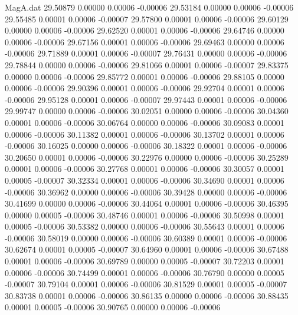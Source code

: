 \begin{filecontents}{MagA.dat}
  29.50879    0.00000    0.00006   -0.00006
  29.53184    0.00000    0.00006   -0.00006
  29.55485    0.00001    0.00006   -0.00007
  29.57800    0.00001    0.00006   -0.00006
  29.60129    0.00000    0.00006   -0.00006
  29.62520    0.00001    0.00006   -0.00006
  29.64746    0.00000    0.00006   -0.00006
  29.67156    0.00001    0.00006   -0.00006
  29.69463    0.00000    0.00006   -0.00006
  29.71889    0.00001    0.00006   -0.00007
  29.76431    0.00000    0.00006   -0.00006
  29.78844    0.00000    0.00006   -0.00006
  29.81066    0.00001    0.00006   -0.00007
  29.83375    0.00000    0.00006   -0.00006
  29.85772    0.00001    0.00006   -0.00006
  29.88105    0.00000    0.00006   -0.00006
  29.90396    0.00001    0.00006   -0.00006
  29.92704    0.00001    0.00006   -0.00006
  29.95128    0.00001    0.00006   -0.00007
  29.97443    0.00001    0.00006   -0.00006
  29.99747    0.00000    0.00006   -0.00006
  30.02051    0.00000    0.00006   -0.00006
  30.04360    0.00001    0.00006   -0.00006
  30.06764    0.00000    0.00006   -0.00006
  30.09083    0.00001    0.00006   -0.00006
  30.11382    0.00001    0.00006   -0.00006
  30.13702    0.00001    0.00006   -0.00006
  30.16025    0.00000    0.00006   -0.00006
  30.18322    0.00001    0.00006   -0.00006
  30.20650    0.00001    0.00006   -0.00006
  30.22976    0.00000    0.00006   -0.00006
  30.25289    0.00001    0.00006   -0.00006
  30.27768    0.00001    0.00006   -0.00006
  30.30057    0.00001    0.00005   -0.00007
  30.32334    0.00001    0.00006   -0.00006
  30.34690    0.00001    0.00006   -0.00006
  30.36962    0.00000    0.00006   -0.00006
  30.39428    0.00000    0.00006   -0.00006
  30.41699    0.00000    0.00006   -0.00006
  30.44064    0.00001    0.00006   -0.00006
  30.46395    0.00000    0.00005   -0.00006
  30.48746    0.00001    0.00006   -0.00006
  30.50998    0.00001    0.00005   -0.00006
  30.53382    0.00000    0.00006   -0.00006
  30.55643    0.00001    0.00006   -0.00006
  30.58019    0.00000    0.00006   -0.00006
  30.60389    0.00001    0.00006   -0.00006
  30.62674    0.00001    0.00005   -0.00007
  30.64960    0.00001    0.00006   -0.00006
  30.67488    0.00001    0.00006   -0.00006
  30.69789    0.00000    0.00005   -0.00007
  30.72203    0.00001    0.00006   -0.00006
  30.74499    0.00001    0.00006   -0.00006
  30.76790    0.00000    0.00005   -0.00007
  30.79104    0.00001    0.00006   -0.00006
  30.81529    0.00001    0.00005   -0.00007
  30.83738    0.00001    0.00006   -0.00006
  30.86135    0.00000    0.00006   -0.00006
  30.88435    0.00001    0.00005   -0.00006
  30.90765    0.00000    0.00006   -0.00006

\end{filecontents}
